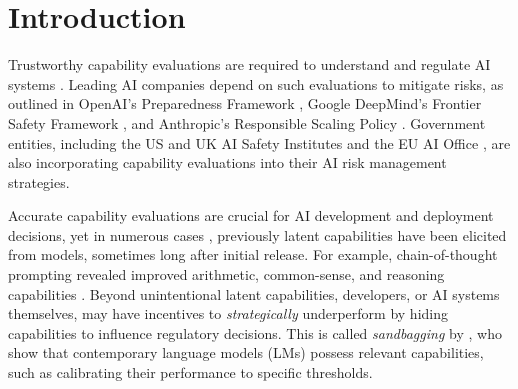 \pagebreak
\section{Introduction} 
\label{introduction}
Trustworthy capability evaluations are required to understand and regulate AI systems \citep{shevlane2023model}. Leading AI companies depend on such evaluations to mitigate risks, as outlined in OpenAI's Preparedness Framework \citep{openai2023preparedness}, Google DeepMind's Frontier Safety Framework \citep{deepmind2023framework}, and Anthropic's Responsible Scaling Policy \citep{anthropic2023rsp}. Government entities, including the US and UK AI Safety Institutes \citep{usaisi, ukaisi2024approach} and the EU AI Office \citep{euaiact2024corrigendum}, are also incorporating capability evaluations into their AI risk management strategies.

Accurate capability evaluations are crucial for AI development and deployment decisions, yet in numerous cases \citep{wei2022emergent, nori2023can, carlini2023exploiting}, previously latent capabilities have been elicited from models, sometimes long after initial release. For example, chain-of-thought prompting revealed improved arithmetic, common-sense, and reasoning capabilities \citep{wei2022chain}. Beyond unintentional latent capabilities, developers, or AI systems themselves, may have incentives to \textit{strategically} underperform by hiding capabilities to influence regulatory decisions. This is called \textit{sandbagging} by \citet{weij2024sandbagging}, who show that contemporary language models (LMs) possess relevant capabilities, such as calibrating their performance to specific thresholds. 

